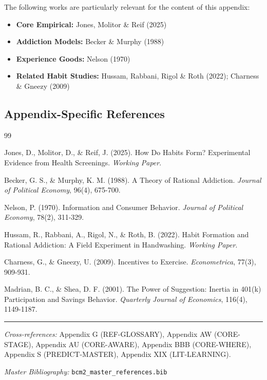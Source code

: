The following works are particularly relevant for the content of this appendix:

\begin{itemize}[nosep]
    \item \textbf{Core Empirical:} Jones, Molitor \& Reif (2025)
    \item \textbf{Addiction Models:} Becker \& Murphy (1988)
    \item \textbf{Experience Goods:} Nelson (1970)
    \item \textbf{Related Habit Studies:} Hussam, Rabbani, Rigol \& Roth (2022); Charness \& Gneezy (2009)
\end{itemize}

\subsection{Appendix-Specific References}

\begin{thebibliography}{99}

 Jones, D., Molitor, D., \& Reif, J. (2025).
How Do Habits Form? Experimental Evidence from Health Screenings.
\textit{Working Paper}.

 Becker, G. S., \& Murphy, K. M. (1988).
A Theory of Rational Addiction. \textit{Journal of Political Economy}, 96(4), 675-700.

 Nelson, P. (1970).
Information and Consumer Behavior. \textit{Journal of Political Economy}, 78(2), 311-329.

 Hussam, R., Rabbani, A., Rigol, N., \& Roth, B. (2022).
Habit Formation and Rational Addiction: A Field Experiment in Handwashing.
\textit{Working Paper}.

 Charness, G., \& Gneezy, U. (2009).
Incentives to Exercise. \textit{Econometrica}, 77(3), 909-931.

 Madrian, B. C., \& Shea, D. F. (2001).
The Power of Suggestion: Inertia in 401(k) Participation and Savings Behavior.
\textit{Quarterly Journal of Economics}, 116(4), 1149-1187.

\end{thebibliography}



\vspace{1em}
\hrule
\vspace{0.5em}

\noindent\textit{Cross-references:}
Appendix G (REF-GLOSSARY),
Appendix AW (CORE-STAGE),
Appendix AU (CORE-AWARE),
Appendix BBB (CORE-WHERE),
Appendix S (PREDICT-MASTER),
Appendix XIX (LIT-LEARNING).

\noindent\textit{Master Bibliography:} \texttt{bcm2\_master\_references.bib}


